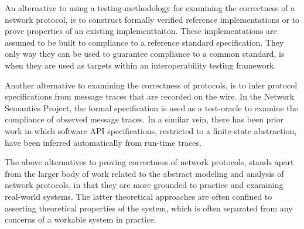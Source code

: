 \documentclass[acmsmall,review,authorversion]{acmart}
\begin{document}
{An alternative to using a testing-methodology for examining the correctness of a network protocol, is to construct formally verified reference implementations or to prove properties of an existing implementtaiton. These implementations are assumed to be built to compliance to a reference standard specification. They only way they can be used to guarantee compliance to a common standard, is when they are used as targets within an interoperability testing framework. 

Another alternative to examining the correctness of protocols, is to infer protocol specifications from message traces that are recorded on the wire. In the Network Semantics Project, the formal specification is used as a test-oracle to examine the compliance of observed message traces. In a similar vein, there has been prior work in which software API specifications, restricted to a finite-state abstraction, have been inferred automatically from run-time traces. 

The above alternatives to proving correctness of network protocols, stands apart from the larger body of work related to the abstract modeling and analysis of network protocols, in that they are more grounded to practice and examining real-world systems. The latter theoretical approaches are often confined to asserting theoretical properties of the system, which is often separated from any concerns of a workable system in practice. 

}

\end{document}
